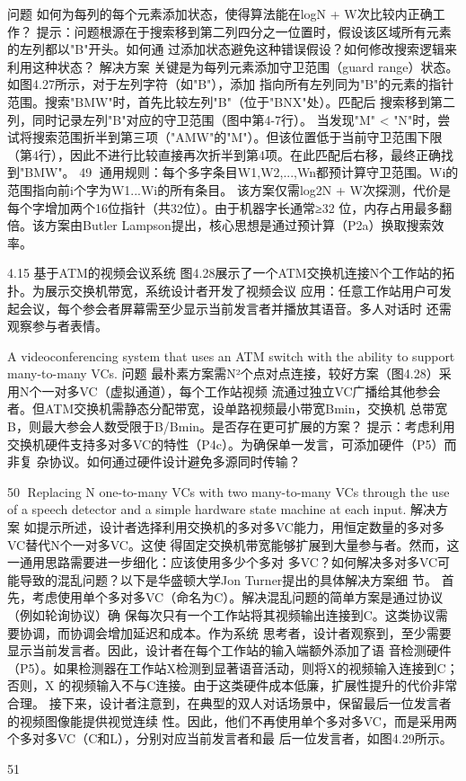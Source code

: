 问题
如何为每列的每个元素添加状态，使得算法能在logN + W次比较内正确工作？
提示：问题根源在于搜索移到第二列四分之一位置时，假设该区域所有元素的左列都以"B"开头。如何通
过添加状态避免这种错误假设？如何修改搜索逻辑来利用这种状态？
解决方案
关键是为每列元素添加守卫范围（guard range）状态。如图4.27所示，对于左列字符（如"B"），添加
指向所有左列同为"B"的元素的指针范围。搜索"BMW"时，首先比较左列"B"（位于"BNX"处）。匹配后
搜索移到第二列，同时记录左列"B"对应的守卫范围（图中第4-7行）。
当发现"M" < "N"时，尝试将搜索范围折半到第三项（"AMW"的"M"）。但该位置低于当前守卫范围下限
（第4行），因此不进行比较直接再次折半到第4项。在此匹配后右移，最终正确找到"BMW"。
                                                     49
通用规则：每个多字条目W1,W2,...,Wn都预计算守卫范围。Wi的范围指向前i个字为W1...Wi的所有条目。
该方案仅需log2N + W次探测，代价是每个字增加两个16位指针（共32位）。由于机器字长通常≥32
位，内存占用最多翻倍。该方案由Butler Lampson提出，核心思想是通过预计算（P2a）换取搜索效
率。


4.15 基于ATM的视频会议系统
图4.28展示了一个ATM交换机连接N个工作站的拓扑。为展示交换机带宽，系统设计者开发了视频会议
应用：任意工作站用户可发起会议，每个参会者屏幕需至少显示当前发言者并播放其语音。多人对话时
还需观察参与者表情。




A videoconferencing system that uses an ATM switch with the ability to support many-to-many
VCs.
问题
最朴素方案需N²个点对点连接，较好方案（图4.28）采用N个一对多VC（虚拟通道），每个工作站视频
流通过独立VC广播给其他参会者。但ATM交换机需静态分配带宽，设单路视频最小带宽Bmin，交换机
总带宽B，则最大参会人数受限于B/Bmin。是否存在更可扩展的方案？
提示：考虑利用交换机硬件支持多对多VC的特性（P4c）。为确保单一发言，可添加硬件（P5）而非复
杂协议。如何通过硬件设计避免多源同时传输？




                                                                                              50
Replacing N one-to-many VCs with two many-to-many VCs through the use of a speech
detector and a simple hardware state machine at each input.
解决方案
如提示所述，设计者选择利用交换机的多对多VC能力，用恒定数量的多对多VC替代N个一对多VC。这使
得固定交换机带宽能够扩展到大量参与者。然而，这一通用思路需要进一步细化：应该使用多少个多对
多VC？如何解决多对多VC可能导致的混乱问题？以下是华盛顿大学Jon Turner提出的具体解决方案细
节。
首先，考虑使用单个多对多VC（命名为C）。解决混乱问题的简单方案是通过协议（例如轮询协议）确
保每次只有一个工作站将其视频输出连接到C。这类协议需要协调，而协调会增加延迟和成本。作为系统
思考者，设计者观察到，至少需要显示当前发言者。因此，设计者在每个工作站的输入端额外添加了语
音检测硬件（P5）。如果检测器在工作站X检测到显著语音活动，则将X的视频输入连接到C；否则，X
的视频输入不与C连接。由于这类硬件成本低廉，扩展性提升的代价非常合理。
接下来，设计者注意到，在典型的双人对话场景中，保留最后一位发言者的视频图像能提供视觉连续
性。因此，他们不再使用单个多对多VC，而是采用两个多对多VC（C和L），分别对应当前发言者和最
后一位发言者，如图4.29所示。




                                                                                    51

